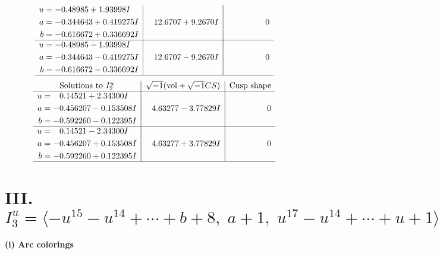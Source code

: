 \documentclass[1p]{elsarticle_modified}
\theoremstyle{definition}
\newcommand{\I}{\sqrt{-1}}
\begin{document}
$$\begin{array}{c|c|c}
\begin{aligned}
u &= -0.48985 + 1.93998 I \\
a &= -0.344643 + 0.419275 I \\
b &= -0.616672 + 0.336692 I\end{aligned}
 & \phantom{-}12.6707 + 9.2670 I & \phantom{-0.000000 } 0 \\ \hline\begin{aligned}
u &= -0.48985 - 1.93998 I \\
a &= -0.344643 - 0.419275 I \\
b &= -0.616672 - 0.336692 I\end{aligned}
 & \phantom{-}12.6707 - 9.2670 I & \phantom{-0.000000 } 0\\
 \hline 
 \end{array}$$\newpage$$\begin{array}{c|c|c}  
\text{Solutions to }I^u_{2}& \I (\text{vol} + \sqrt{-1}CS) & \text{Cusp shape}\\
 \hline 
\begin{aligned}
u &= \phantom{-}0.14521 + 2.34300 I \\
a &= -0.456207 - 0.153508 I \\
b &= -0.592260 - 0.122395 I\end{aligned}
 & \phantom{-}4.63277 - 3.77829 I & \phantom{-0.000000 } 0 \\ \hline\begin{aligned}
u &= \phantom{-}0.14521 - 2.34300 I \\
a &= -0.456207 + 0.153508 I \\
b &= -0.592260 + 0.122395 I\end{aligned}
 & \phantom{-}4.63277 + 3.77829 I & \phantom{-0.000000 } 0\\
 \hline 
 \end{array}$$\newpage\newpage\renewcommand{\arraystretch}{1}
\centering \section*{III. $I^u_{3}= \langle - u^{15}- u^{14}+\cdots+b+8,\;a+1,\;u^{17}- u^{14}+\cdots+u+1 \rangle$}
\flushleft \textbf{(i) Arc colorings}\\
\end{document}
